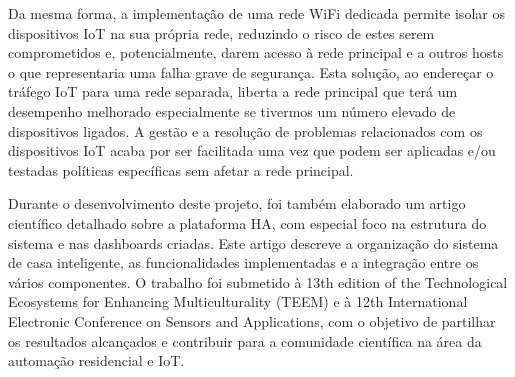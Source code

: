 Da mesma forma, a implementação de uma rede WiFi dedicada permite isolar os dispositivos \gls{IoT} na sua própria rede, reduzindo o risco de estes serem comprometidos e, potencialmente, darem acesso à rede principal e a outros hosts o que representaria uma falha grave de segurança. Esta solução, ao endereçar o tráfego \gls{IoT} para uma rede separada, liberta a rede principal que terá um desempenho melhorado especialmente se tivermos um número elevado de dispositivos ligados. A gestão e a resolução de problemas relacionados com os dispositivos \gls{IoT} acaba por ser facilitada uma vez que podem ser aplicadas e/ou testadas políticas específicas sem afetar a rede principal.

Durante o desenvolvimento deste projeto, foi também elaborado um artigo científico detalhado sobre a plataforma \gls{HA}, com especial foco na estrutura do sistema e nas dashboards criadas. Este artigo descreve a organização do sistema de casa inteligente, as funcionalidades implementadas e a integração entre os vários componentes. O trabalho foi submetido à 13th edition of the Technological Ecosystems for Enhancing Multiculturality (TEEM) e à 12th International Electronic Conference on Sensors and Applications, com o objetivo de partilhar os resultados alcançados e contribuir para a comunidade científica na área da automação residencial e IoT.

